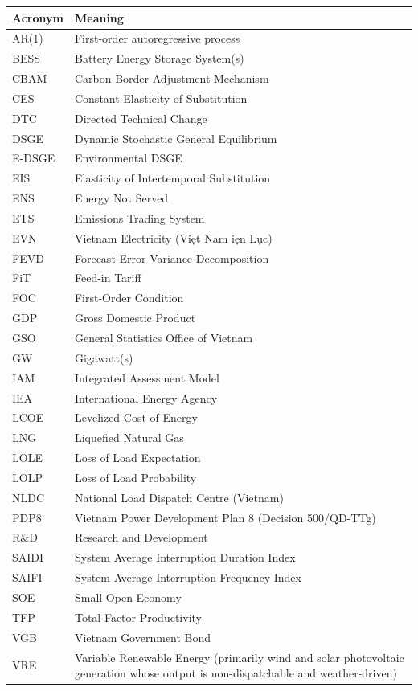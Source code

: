 \documentclass[12pt, a4paper]{article}
\begin{document}
	\begin{tabular}{@{} l p{11cm} @{}}
		\textbf{Acronym} & \textbf{Meaning}\\
		\midrule
		AR(1) & First-order autoregressive process \\
		BESS & Battery Energy Storage System(s) \\
		CBAM & Carbon Border Adjustment Mechanism \\
		CES & Constant Elasticity of Substitution \\
		DTC & Directed Technical Change \\
		DSGE & Dynamic Stochastic General Equilibrium \\
		E-DSGE & Environmental DSGE \\
		EIS & Elasticity of Intertemporal Substitution \\
		ENS & Energy Not Served \\
		ETS & Emissions Trading System \\
		EVN & Vietnam Electricity (Vi\d{e}t Nam \DJ i\d{e}n L\d{u}c) \\
		FEVD & Forecast Error Variance Decomposition \\
		FiT & Feed-in Tariff \\
		FOC & First-Order Condition \\
		GDP & Gross Domestic Product \\
		GSO & General Statistics Office of Vietnam \\
		GW & Gigawatt(s) \\
		IAM & Integrated Assessment Model \\
		IEA & International Energy Agency \\
		LCOE & Levelized Cost of Energy \\
		LNG & Liquefied Natural Gas \\
		LOLE & Loss of Load Expectation \\
		LOLP & Loss of Load Probability \\
		NLDC & National Load Dispatch Centre (Vietnam) \\
		PDP8 & Vietnam Power Development Plan 8 (Decision 500/QD-TTg) \\
		R\&D & Research and Development \\
		SAIDI & System Average Interruption Duration Index \\
		SAIFI & System Average Interruption Frequency Index \\
		SOE & Small Open Economy \\
		TFP & Total Factor Productivity \\
		VGB & Vietnam Government Bond \\
		VRE & Variable Renewable Energy (primarily wind and solar photovoltaic generation whose output is non-dispatchable and weather-driven) \\
	\end{tabular}
	
\end{document}
